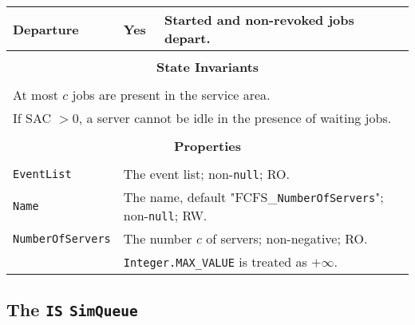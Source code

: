 \documentclass[12pt]{book}
\begin{document}
\begin{tabular}{|l|l|l|}
\hline
Departure & Yes & Started and non-revoked jobs depart. \\
\hline
\multicolumn{3}{|c|}{} \\
\multicolumn{3}{|c|}{\bf State  Invariants} \\
\multicolumn{3}{|c|}{} \\
\hline
\multicolumn{3}{|l|}{At most $c$ jobs are present in the service area.} \\
\multicolumn{3}{|l|}{If SAC $> 0$, a server cannot be idle in the presence of waiting jobs.} \\
\hline
\multicolumn{3}{|c|}{} \\
\multicolumn{3}{|c|}{\bf Properties} \\
\multicolumn{3}{|c|}{} \\
\hline
\lstinline|EventList|       & \multicolumn{2}{|l|}{The event list; non-\lstinline|null|; RO.} \\
\hline
\lstinline|Name|            & \multicolumn{2}{|l|}{The name, default "FCFS\_\lstinline{NumberOfServers}";
                                                   non-\lstinline|null|; RW.} \\
\hline
\lstinline|NumberOfServers| & \multicolumn{2}{|l|}{The number $c$ of servers; non-negative; RO.} \\
                            & \multicolumn{2}{|l|}{\lstinline|Integer.MAX_VALUE| is treated as $+\infty$.} \\
\hline
\end{tabular}

\subsection{The \lstinline{IS} \lstinline{SimQueue}}
\end{document}
